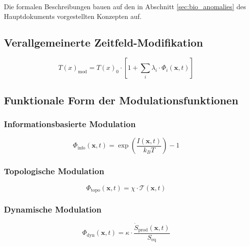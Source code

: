 \documentclass[12pt,a4paper]{article}
\newcommand{\Tfield}{T(x)}
\begin{document}
	Die formalen Beschreibungen bauen auf den in Abschnitt \ref{sec:bio_anomalies} des Hauptdokuments vorgestellten Konzepten auf.
	
	\subsection{Verallgemeinerte Zeitfeld-Modifikation}
	\label{subsec:zeitfeld_modifikation}
	
	\begin{equation}
		\Tfield_{\text{mod}} = \Tfield_0 \cdot \left[ 1 + \sum_i \lambda_i \cdot \Phi_i(\mathbf{x}, t) \right]
	\end{equation}
	
	\subsection{Funktionale Form der Modulationsfunktionen}
	\label{subsec:modulationsfunktionen}
	
	\subsubsection{Informationsbasierte Modulation}
	\label{subsubsec:info_modulation}
	
	\begin{equation}
		\Phi_{\text{info}}(\mathbf{x}, t) = \exp\left(\frac{I(\mathbf{x}, t)}{k_B T}\right) - 1
	\end{equation}
	
	\subsubsection{Topologische Modulation}
	\label{subsubsec:topo_modulation}
	
	\begin{equation}
		\Phi_{\text{topo}}(\mathbf{x}, t) = \chi \cdot \mathcal{T}(\mathbf{x}, t)
	\end{equation}
	
	\subsubsection{Dynamische Modulation}
	\label{subsubsec:dyn_modulation}
	
	\begin{equation}
		\Phi_{\text{dyn}}(\mathbf{x}, t) = \kappa \cdot \frac{\dot{S}_{\text{prod}}(\mathbf{x}, t)}{S_{\text{eq}}}
	\end{equation}
	
\end{document}
